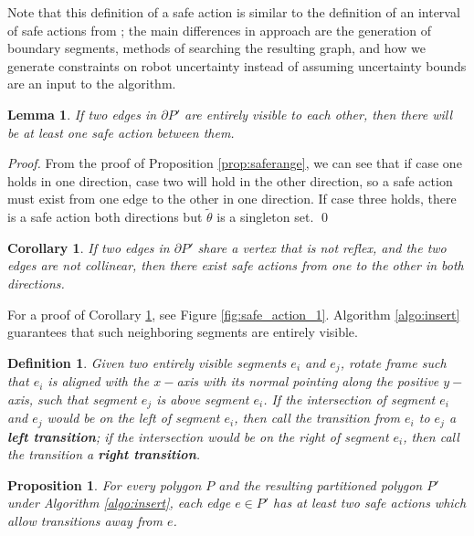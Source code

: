 \documentclass[sageh,times,Review]{sagej}
\newtheorem{proposition}{Proposition}
\newtheorem{definition}{Definition}
\newtheorem{corollary}{Corollary}
\newtheorem{lemma}{Lemma}
\begin{document}
Note that this definition of a safe action is similar to the definition of an interval of
safe actions from \cite{LewOKa13}; the main differences in approach are the
generation of boundary segments, methods of searching the resulting graph, and
how we generate constraints on robot uncertainty instead of assuming uncertainty
bounds are an input to the algorithm.

\begin{lemma} \label{lem:action}
If two edges in $\partial P'$ are entirely visible to each other, then there will be at least one safe
action between them.
\end{lemma}

\begin{proof}
From the proof of Proposition \ref{prop:saferange}, we can see that if case one
holds in one direction, case two will hold in the other direction, so a safe
action must exist from one edge to the other in one direction. If case three
holds, there is a safe action both directions but $\tilde{\theta}$ is a
singleton set. \qed
\end{proof}


\begin{corollary} \label{coro:neighbor}
If two edges in $\partial P'$ share a vertex that is not reflex, and the two
 edges are not collinear, then there exist safe actions
from one to the other in both directions.
\end{corollary}

For a proof of Corollary \ref{coro:neighbor}, see Figure \ref{fig:safe_action_1}.
Algorithm \ref{algo:insert} guarantees that such neighboring segments are
entirely visible.

\begin{definition}
Given two entirely visible segments $e_i$ and $e_j$,
rotate frame such that $e_i$ is aligned with the $x-$axis with its normal pointing
along the positive $y-$axis, such that 
segment $e_j$ is above segment $e_i$. If the intersection of segment $e_i$ and
$e_j$ would be on the left of segment $e_i$, then call the transition from $e_i$ to $e_j$ a
\textbf{left
transition}; if the intersection would be on the right of segment $e_i$, then call the
transition a \textbf{right transition}.
\end{definition}

\begin{proposition} \label{prop:twosafe}
For every polygon $P$ and the resulting partitioned polygon $P'$ under Algorithm
\ref{algo:insert}, each edge $e \in P'$ has at least two safe actions which allow
transitions away from $e$.
\end{proposition}
\end{document}
